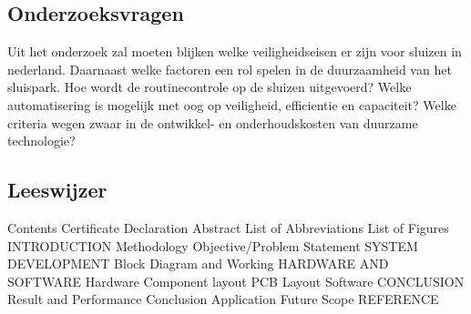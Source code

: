 \subsection{Onderzoeksvragen}
 

Uit het onderzoek zal moeten blijken welke veiligheidseisen er zijn voor sluizen in nederland. Daarnaast welke factoren een rol spelen in de duurzaamheid van het sluispark.  
Hoe wordt de routinecontrole op de sluizen uitgevoerd?  
Welke automatisering is mogelijk met oog op veiligheid, efficientie en capaciteit?  
Welke criteria wegen zwaar in de ontwikkel- en onderhoudskosten van duurzame technologie?  

\subsection{Leeswijzer}


Contents
Certificate 
Declaration  
Abstract  
List of Abbreviations  
List of Figures 
INTRODUCTION  
Methodology 
Objective/Problem Statement  
SYSTEM DEVELOPMENT 
Block Diagram and Working  
HARDWARE AND SOFTWARE 
Hardware 
Component layout  
PCB Layout  
Software  
CONCLUSION  
Result and Performance  
Conclusion  
Application 
Future Scope  
REFERENCE
